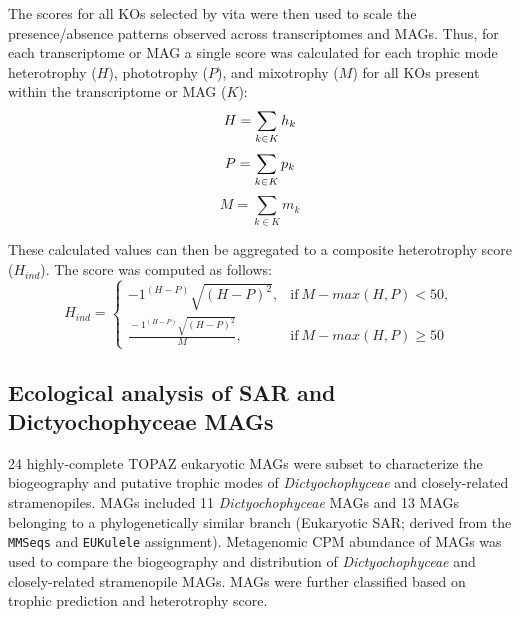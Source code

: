 \documentclass[12pt]{article}
\numberwithin{equation}{section}
\begin{document}
The scores for all KOs selected by vita were then used to scale the presence/absence patterns observed across transcriptomes and MAGs. Thus, for each transcriptome or MAG a single score was calculated for each trophic mode heterotrophy ($H$), phototrophy ($P$), and mixotrophy ($M$) for all KOs present within the transcriptome or MAG ($K$):
  \begin{equation}\label{eq:sum}
  H = \sum_{k \in K} h_k \\ 
  \end{equation}
  \begin{equation}
    P = \sum_{k \in K} p_k \\
\end{equation}
  \begin{equation}
    M = \sum_{k \in K} m_k
\end{equation}

These calculated values can then be aggregated to a composite heterotrophy score ($H_{ind}$). The score was computed as follows: 
\begin{equation}\label{eq:hind}
  H_{ind}=
    \begin{cases}
      -1^{(H-P)}\sqrt{(H-P)^2}, & \text{if}\ M-max(H,P)<50, \\
      \frac{{}-1^{(H-P)}\sqrt{(H-P)^2}}{M}, & \text{if} \ M-max(H,P) \geq 50
    \end{cases}
  \end{equation}
  
\subsection*{Ecological analysis of SAR and Dictyochophyceae MAGs}
24 highly-complete TOPAZ eukaryotic MAGs were subset to characterize the biogeography and putative trophic modes of \emph{Dictyochophyceae} and closely-related stramenopiles. MAGs included 11 \emph{Dictyochophyceae} MAGs and 13 MAGs belonging to a phylogenetically similar branch (Eukaryotic SAR; derived from the \texttt{MMSeqs} and \texttt{EUKulele} assignment). Metagenomic CPM abundance of MAGs was used to compare the biogeography and distribution of \emph{Dictyochophyceae} and closely-related stramenopile MAGs. MAGs were further classified based on trophic prediction and heterotrophy score. 
\end{document}
